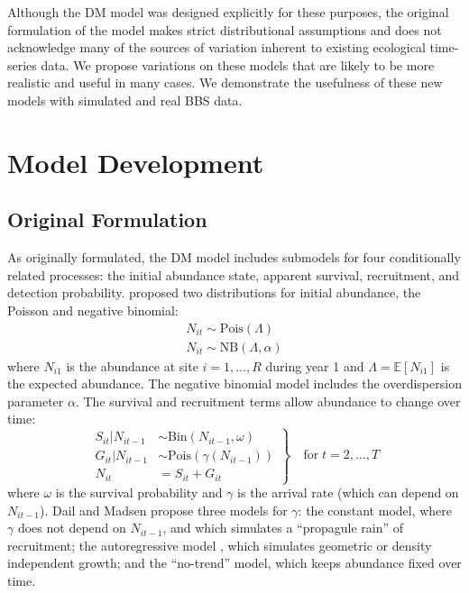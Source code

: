 \documentclass[12pt]{article}
\begin{document}
Although the DM model was designed explicitly for these purposes, the
original formulation of the model makes strict distributional
assumptions and does not acknowledge many of the sources of variation
inherent to existing ecological time-series data.  We propose
variations on these models that are likely to be more realistic and
useful in many cases.  We demonstrate the usefulness of these new
models with simulated and real BBS data.


\section{Model Development}

\subsection{Original Formulation}

As originally formulated, the DM model includes submodels for four
conditionally related processes: the initial abundance state, apparent
survival, recruitment, and detection probability. \citet{dail_madsen:2011}
proposed two distributions for initial abundance, the Poisson and negative
binomial:
\begin{gather}
N_{it} \sim \mathrm{Pois}(\Lambda) \nonumber \\
N_{it} \sim \mathrm{NB}(\Lambda, \alpha)
\label{eq:N1}
\end{gather}
where $N_{i1}$ is the abundance at site $i=1,\hdots,R$ during year 1
and $\Lambda=\mathbb{E}[N_{i1}]$ is the expected abundance. The negative
binomial model includes the overdispersion parameter $\alpha$.  The
survival and recruitment terms allow abundance to change over time:
\begin{equation}
\left.\begin{aligned}
S_{it}|N_{it-1} &\sim \mathrm{Bin}(N_{it-1}, \omega) \\
G_{it}|N_{it-1} &\sim \mathrm{Pois}(\gamma(N_{it-1})) \\
N_{it} &= S_{it}+G_{it}
\end{aligned}\right\} \quad \text{for} \; t=2,\hdots,T
\label{eq:Nt}
\end{equation}
where $\omega$ is the survival probability and $\gamma$ is the arrival
rate (which can depend on $N_{it-1}$). Dail and Madsen propose three models
for $\gamma$: the constant model, where $\gamma$ does not depend on
$N_{it-1}$, and which simulates a ``propagule rain'' of recruitment; the
autoregressive model , which
simulates geometric or density independent growth; and the ``no-trend''
model, which keeps abundance fixed over time.
\end{document}
